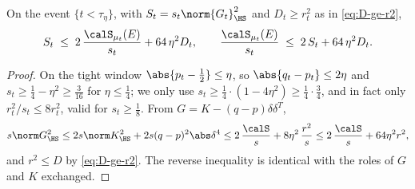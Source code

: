 \documentclass[../../main.tex]{subfiles}
\begin{document}
\begin{lemma}
\label{lem:stein-vs-source}
On the event $\{t<\tau_\eta\}$, with $S_t=s_t\norm{G_t}_\HS^2$ and $D_t\ge r_t^2$ as in
\eqref{eq:D-ge-r2},
\begin{equation}\label{eq:conversion}
  S_t\;\le\;2\,\frac{\calS_{\mu_t}(E)}{s_t}+64\,\eta^2 D_t,
  \qquad
  \frac{\calS_{\mu_t}(E)}{s_t}\;\le\;2\,S_t+64\,\eta^2 D_t .
\end{equation}
\end{lemma}

\begin{proof}
On the tight window $\abs{p_t-\tfrac12}\le\eta$, so $\abs{q_t-p_t}\le2\eta$ and
$s_t\ge\tfrac14-\eta^2\ge\tfrac3{16}$ for $\eta\le\tfrac14$; we only use $s_t\ge\tfrac14\cdot
(1-4\eta^2)\ge\tfrac1{4}\cdot\tfrac34$, and in fact only $r_t^2/s_t\le 8r_t^2$, valid for
$s_t\ge\tfrac18$. From $G=K-(q-p)\delta\delta^T$,
\[
  s\norm G_\HS^2\le2s\norm K_\HS^2+2s(q-p)^2\abs\delta^4
  \le2\,\frac{\calS}{s}+8\eta^2\,\frac{r^2}{s}
  \le2\,\frac{\calS}{s}+64\eta^2r^2 ,
\]
and $r^2\le D$ by \eqref{eq:D-ge-r2}. The reverse inequality is identical with the roles of $G$
and $K$ exchanged.
\end{proof}
\end{document}
